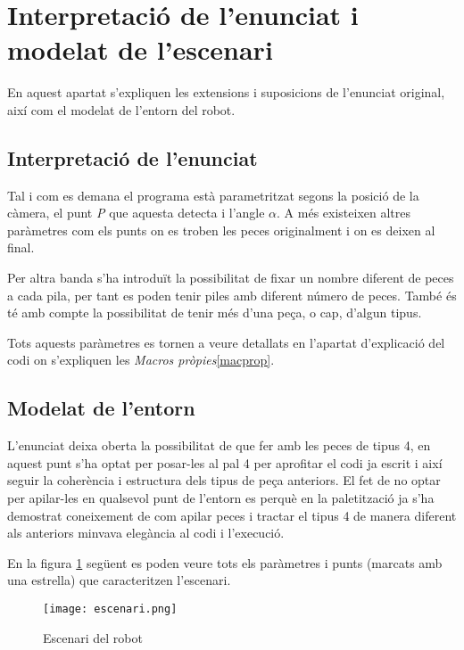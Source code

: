 \section{Interpretació de l'enunciat i modelat de l'escenari}
En aquest apartat s'expliquen les extensions i suposicions de l'enunciat original,
així com el modelat de l'entorn del robot.

\subsection{Interpretació de l'enunciat}
Tal i com es demana el programa està parametritzat segons la posició de la càmera,
el punt \emph{P} que aquesta detecta i l'angle $\alpha$. A més existeixen altres paràmetres
com els punts on es troben les peces originalment i on es deixen al final.

Per altra banda s'ha introduït la possibilitat de fixar un nombre diferent de peces
a cada pila, per tant es poden tenir piles amb diferent número de peces. També
és té amb compte la possibilitat de tenir més d'una peça, o cap, d'algun tipus.

Tots aquests paràmetres es tornen a veure detallats en l'apartat d'explicació del
codi on s'expliquen les \emph{Macros pròpies}\ref{macprop}.

\subsection{Modelat de l'entorn}

L'enunciat deixa oberta la possibilitat de que fer amb les peces de
tipus 4, en aquest punt s'ha optat per posar-les al pal 4 per aprofitar el codi ja escrit i
així seguir la coherència i estructura dels tipus de peça anteriors. El fet de
no optar per apilar-les en qualsevol punt de l'entorn es perquè en la paletització
ja s'ha demostrat coneixement de com apilar peces i tractar el tipus 4 de manera
diferent als anteriors minvava elegància al codi i l'execució.

En la figura \ref{figescenari} següent es poden veure tots els paràmetres i punts
(marcats amb una estrella) que caracteritzen l'escenari.

\begin{figure}[H]
\begin{center}\label{figescenari}
 \texttt{[image: escenari.png]}
\end{center}
  \caption{Escenari del robot}
\end{figure}


